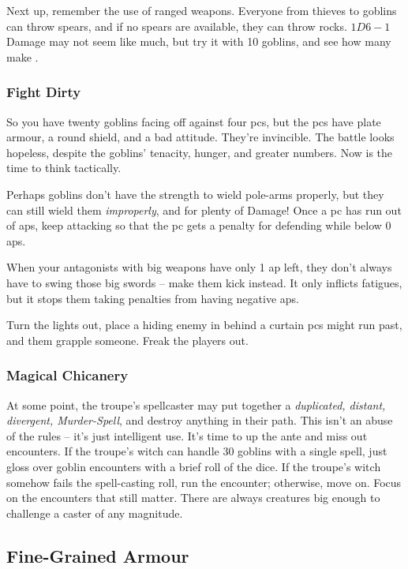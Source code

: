 \begin{multicols}{2}
Next up, remember the use of ranged weapons.
Everyone from thieves to goblins can throw spears, and if no spears are available, they can throw rocks.
$1D6-1$ Damage may not seem like much, but try it with 10 goblins, and see how many make .

\subsubsection{Fight Dirty}

So you have twenty goblins facing off against four \glspl{pc}, but the \glspl{pc} have plate armour, a round shield, and a bad attitude.
They're invincible.
The battle looks hopeless, despite the goblins' tenacity, hunger, and greater numbers.
Now is the time to think tactically.

Perhaps goblins don't have the strength to wield pole-arms properly, but they can still wield them \emph{improperly}, and for plenty of Damage!
Once a \gls{pc} has run out of \glspl{ap}, keep attacking so that the \gls{pc} gets a penalty for defending while below 0 \glspl{ap}.

When your antagonists with big weapons have only 1 \gls{ap} left, they don't always have to swing those big swords -- make them kick instead.
It only inflicts \glspl{fatigue}, but it stops them taking penalties from having negative \glspl{ap}.

Turn the lights out, place a hiding enemy in behind a curtain \glspl{pc} might run past, and them grapple someone.
Freak the players out.

\subsubsection{Magical Chicanery}

At some point, the troupe's spellcaster may put together a \textit{duplicated, distant, divergent, Murder-Spell}, and destroy anything in their path.
This isn't an abuse of the rules -- it's just intelligent use.
It's time to up the ante and miss out encounters.
If the troupe's witch can handle 30 goblins with a single spell, just gloss over goblin encounters with a brief roll of the dice.
If the troupe's witch somehow fails the spell-casting roll, run the encounter; otherwise, move on.
Focus on the encounters that still matter.
There are always creatures big enough to challenge a caster of any magnitude.

\subsection{Fine-Grained Armour}


\end{multicols}

